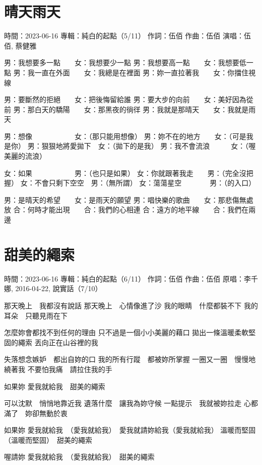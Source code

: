 \documentclass[UTF8,a4paper,oneside,twocolumn,12pt]{ctexbook}
\newcommand{\infopair}[2]{\textbullet #1：#2}
\newcommand{\zc}[1][伍佰]{\infopair{作詞}{#1}}
\newcommand{\zq}[1][伍佰]{\infopair{作曲}{#1}}
\newcommand{\zj}[1]{\infopair{專輯}{#1}}
\newcommand{\yc}[1]{\infopair{原唱}{#1}}
\newcommand{\sj}[1]{\infopair{時間}{#1}}
\newenvironment{info}{\begin{flushleft}\kaishu
	}
	{\end{flushleft}\normalsize\yahei\par}
\newenvironment{lyric}{
	}
{}
\begin{document}
\section{晴天雨天}
\begin{info}
	\sj{2023-06-16}
	\zj{純白的起點（5/11）}
	\zc
	\zq
	\infopair{演唱}{伍佰, 蔡健雅}
\end{info}
\begin{lyric}
	男：我想要多一點　　女：我想要少一點
	男：我想要高一點　　女：我想要低一點
	男：我一直在外面　　女：我總是在裡面
	男：妳一直拉著我　　女：你擋住視線

	男：要斷然的拒絕　　女：把後悔留給誰
	男：要大步的向前　　女：美好因為從前
	男：那白天的驕陽　　女：那黑夜的徜徉
	男：我就是那晴天　　女：我就是雨天

	男：想像　　　　　　女：（那只能用想像）
	男：妳不在的地方　　女：（可是我是你）
	男：狠狠地將愛拋下　女：（拋下的是我）
	男：我不會流浪　　　女：（喔美麗的流浪）

	女：如果　　　　　　男：（也只是如果）
	女：你就跟著我走　　男：（完全沒把握）
	女：不會只剩下空空　男：（無所謂）
	女：蕩蕩星空　　　　男：（的入口）

	男：是晴天的希望　　女：是雨天的願望
	男：唱快樂的歌曲　　女：那悲傷無處放
	合：何時才能出現　　合：我們的心相連
	合：遠方的地平線　　合：我們在兩邊
\end{lyric}

\section{甜美的繩索}
\begin{info}
	\sj{2023-06-16}
	\zj{純白的起點（6/11）}
	\zc
	\zq
	\yc{李千娜, 2016-04-22, 說實話（7/10）}
\end{info}
\begin{lyric}
	那天晚上　我都沒有說話
	那天晚上　心情像進了沙
	我的眼睛　什麼都裝不下
	我的耳朵　只聽見雨在下

	怎麼妳會都找不到任何的理由
	只不過是一個小小美麗的藉口
	拋出一條溫暖柔軟堅固的繩索
	丟向正在山谷裡的我

	失落想念嫉妒　都出自妳的口
	我的所有行蹤　都被妳所掌握
	一圈又一圈　慢慢地繞著我
	不要怕我痛　請拉住我的手

	如果妳
	愛我就給我　甜美的繩索

	可以沈默　悄悄地靠近我
	遺落什麼　讓我為妳守候
	一點提示　我就被妳拉走
	心都滿了　妳卻無動於衷

	如果妳
	愛我就給我　（愛我就給我）　愛我就請妳給我（愛我就給我）
	溫暖而堅固　（溫暖而堅固）　甜美的繩索

	喔請妳
	愛我就給我　（愛我就給我）　甜美的繩索
\end{lyric}
\end{document}
